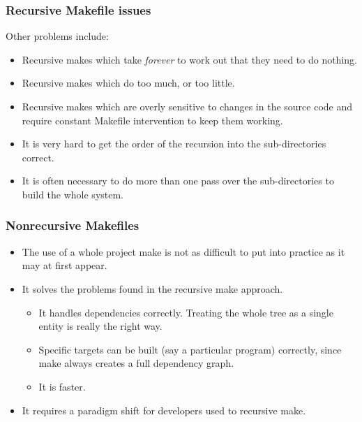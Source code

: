 \documentclass[11pt]{beamer}
\begin{document}

\begin{frame}
  \frametitle{Recursive Makefile issues}
  Other problems include:

  \begin{itemize}
    \item Recursive makes which take \emph{forever} to work out that they need
      to do nothing.\\[2mm]
    \item Recursive makes which do too much, or too little.\\[2mm]
    \item Recursive makes which are overly sensitive to changes in the source
      code and require constant Makefile intervention to keep them
      working.\\[2mm]
    \item It is very hard to get the order of the recursion into the
      sub-directories correct.\\[2mm]
    \item It is often necessary to do more than one pass over the
      sub-directories to build the whole system.
  \end{itemize}
\end{frame}


\begin{frame}
  \frametitle{Nonrecursive Makefiles}
  \begin{itemize}
    \item The use of a whole project make is not as difficult to put into
      practice as it may at first appear.\\[5mm]
    \item It solves the problems found in the recursive make approach.

      \begin{itemize}
      \item It handles dependencies correctly. Treating the whole tree as a
        single entity is really the right way.\\[1mm]
      \item Specific targets can be built (say a particular program)
        correctly, since make always creates a full dependency graph.\\[1mm]
      \item It is faster.\\[5mm]
      \end{itemize}
    \item It requires a paradigm shift for developers used to recursive
      make.
  \end{itemize}
\end{frame}
\end{document}

